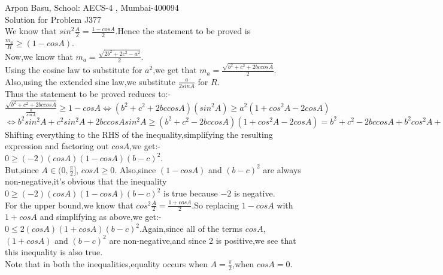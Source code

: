 \documentclass[10pt,a4paper]{extarticle}
\begin{document}
 
Arpon Basu, School: AECS-4 , Mumbai-400094\\
 
Solution for Problem J377 \\

We know that $sin^{2} \frac{A}{2}=\frac{1-cosA}{2}$.Hence the statement to be proved is $\frac{m_{a}}{R}\geq (1-cosA) $.\\
Now,we know that $m_{a}=\frac{\sqrt{2b^{2}+2c^{2}-a^{2}}}{2}$.\\
Using the cosine law to substitute for $a^{2}$,we get that $m_{a}=\frac{\sqrt{b^{2}+c^{2}+2bccosA}}{2}$.\\
Also,using the extended sine law,we substitute $\frac{a}{2sinA}$ for $R$.\\
Thus the statement to be proved reduces to:-\\
$\frac{\sqrt{b^{2}+c^{2}+2bccosA}}{\frac{a}{sinA}}\geq 1-cosA\Leftrightarrow (b^{2}+c^{2}+2bccosA)(sin^{2}A)\geq a^{2}(1+cos^{2}A-2cosA)$
$\Leftrightarrow b^{2}sin^{2}A+c^{2}sin^{2}A+2bccosAsin^{2}A\geq (b^{2}+c^{2}-2bccosA)(1+cos^{2}A-2cosA)=b^{2}+c^{2}-2bccosA+b^{2}cos^{2}A+c^{2}cos^{2}A-2bccos^{3}A-2b^{2}cosA-2c^{2}cosA+4bccos^{2}A$\\
Shifting everything to the RHS of the inequality,simplifying the resulting expression and factoring out $cosA$,we get:-\\
$0\geq (-2)(cosA)(1-cosA)(b-c)^{2}$.\\
But,since $A\in (0,\frac{\pi}{2}]$, $cosA\geq 0$. Also,since $(1-cosA)$ and $(b-c)^{2}$ are always non-negative,it's obvious that the inequality $0\geq (-2)(cosA)(1-cosA)(b-c)^{2}$ is true because $-2$ is negative.\\
For the upper bound,we know that $cos^{2}\frac{A}{2}=\frac{1+cosA}{2}$.So replacing $1-cosA$ with $1+cosA$ and simplifying as above,we get:-\\
$0\leq 2(cosA)(1+cosA)(b-c)^{2}$.Again,since all of the terms $cosA$,$(1+cosA)$ and $(b-c)^{2}$ are non-negative,and since 2 is positive,we see that this inequality is also true.\\
Note that in both the inequalities,equality occurs when $A=\frac{\pi}{2}$,when $cosA=0$.\\


 
\end{document}
